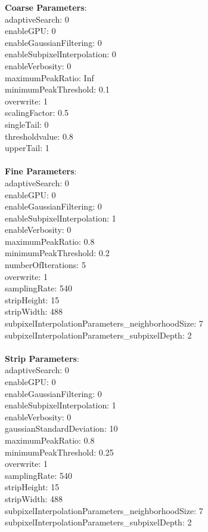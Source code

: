 \documentclass[11pt]{article}
\begin{document}
\textbf{Coarse Parameters}: \\
adaptiveSearch: 0\\
enableGPU: 0\\
enableGaussianFiltering: 0\\
enableSubpixelInterpolation: 0\\
enableVerbosity: 0\\
maximumPeakRatio: Inf\\
minimumPeakThreshold: 0.1\\
overwrite: 1\\
scalingFactor: 0.5\\
singleTail: 0\\
thresholdvalue: 0.8\\
upperTail: 1\\
\\
\textbf{Fine Parameters}: \\
adaptiveSearch: 0\\
enableGPU: 0\\
enableGaussianFiltering: 0\\
enableSubpixelInterpolation: 1\\
enableVerbosity: 0\\
maximumPeakRatio: 0.8\\
minimumPeakThreshold: 0.2\\
numberOfIterations: 5\\
overwrite: 1\\
samplingRate: 540\\
stripHeight: 15\\
stripWidth: 488\\
subpixelInterpolationParameters\_neighborhoodSize: 7\\
subpixelInterpolationParameters\_subpixelDepth: 2\\
\\
\textbf{Strip Parameters}: \\
adaptiveSearch: 0\\
enableGPU: 0\\
enableGaussianFiltering: 0\\
enableSubpixelInterpolation: 1\\
enableVerbosity: 0\\
gaussianStandardDeviation: 10\\
maximumPeakRatio: 0.8\\
minimumPeakThreshold: 0.25\\
overwrite: 1\\
samplingRate: 540\\
stripHeight: 15\\
stripWidth: 488\\
subpixelInterpolationParameters\_neighborhoodSize: 7\\
subpixelInterpolationParameters\_subpixelDepth: 2\\
\\
\newpage
\end{document}
